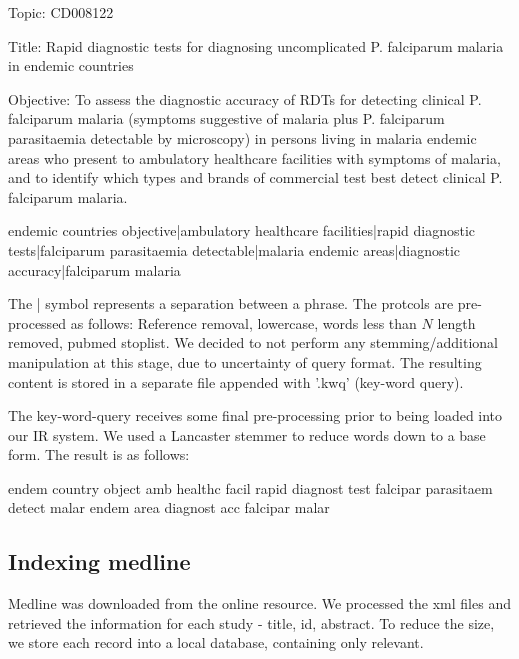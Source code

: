 \begin{tcolorbox}

Topic: CD008122 

Title: Rapid diagnostic tests for diagnosing uncomplicated P. falciparum malaria in endemic countries 

Objective: To assess the diagnostic accuracy of RDTs for detecting clinical P. falciparum malaria (symptoms suggestive of malaria plus P. falciparum parasitaemia detectable by microscopy) in persons living in malaria endemic areas who present to ambulatory healthcare facilities with symptoms of malaria, and to identify which types and brands of commercial test best detect clinical P. falciparum malaria.

\end{tcolorbox}

 
\begin{tcolorbox}

endemic countries objective|ambulatory healthcare facilities|rapid diagnostic tests|falciparum parasitaemia detectable|malaria endemic areas|diagnostic accuracy|falciparum malaria

\end{tcolorbox}

The | symbol represents a separation between a phrase. The protcols are pre-processed as follows: Reference removal, lowercase, words less than $N$ length removed, pubmed stoplist. We decided to not perform any stemming/additional manipulation at this stage, due to uncertainty of query format. The resulting content is stored in a separate file appended with '.kwq' (key-word query).

The key-word-query receives some final pre-processing prior to being loaded into our IR system. We used a Lancaster stemmer to reduce words down to a base form. The result is as follows:

\begin{tcolorbox}

endem country object amb healthc facil rapid diagnost test falcipar parasitaem detect malar endem area diagnost acc falcipar malar

\end{tcolorbox}

\subsection{Indexing medline}

Medline was downloaded from the online resource. We processed the xml files and retrieved the  information for each study - title, id, abstract. To reduce the size, we store each record into a local database, containing only relevant.

